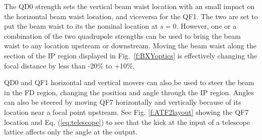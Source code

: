 The QD0 strength sets the vertical beam waist location with an small impact on the horizontal beam waist location, and viceversa for the QF1. The two are set to put the beam waist to its the nominal location at $s=0$. However, one or a combination of the two quadrupole strengths can be used to bring the beam waist to any location upstream or downstream. Moving the beam waist along the section of the IP region displayed in Fig.~\ref{f:BXYoptics} is effectively changing the focal distance by less than -20\% to +10\%.\par
QD0 and QF1 horizontal and vertical movers can also be used to steer the beam in the FD region, changing the position and angle through the IP region. Angles can also be steered by moving QF7 horizontally and vertically because of its location near a focal point upstream. See Fig. \ref{f:ATF2layout} showing the QF7 location and Eq. (\ref{eq:telescope}) to see that the kick at the input of a telescope lattice affects only the angle at the output.\par

